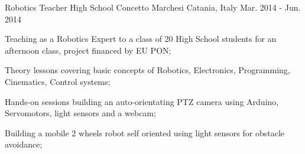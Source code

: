 \begin{cventries}
    \cventry
    {Robotics Teacher} %
    {High School Concetto Marchesi} %
    {Catania, Italy} %
    {Mar. 2014 - Jun. 2014} %
    {
      \begin{cvitems} %
        \item {Teaching as a
        Robotics Expert to a class of 20 High School students for an afternoon class, project financed by EU PON;}
        \item {Theory lessons covering basic concepts of Robotics, Electronics, Programming, Cinematics, Control systems;}
        \item {Hands-on sessions building an auto-orientating PTZ camera using Arduino, Servomotors, light sensors and a webcam;}
        \item {Building a mobile 2 wheels robot self oriented using light sensors for obstacle avoidance;}
      \end{cvitems}
    }
\end{cventries}
